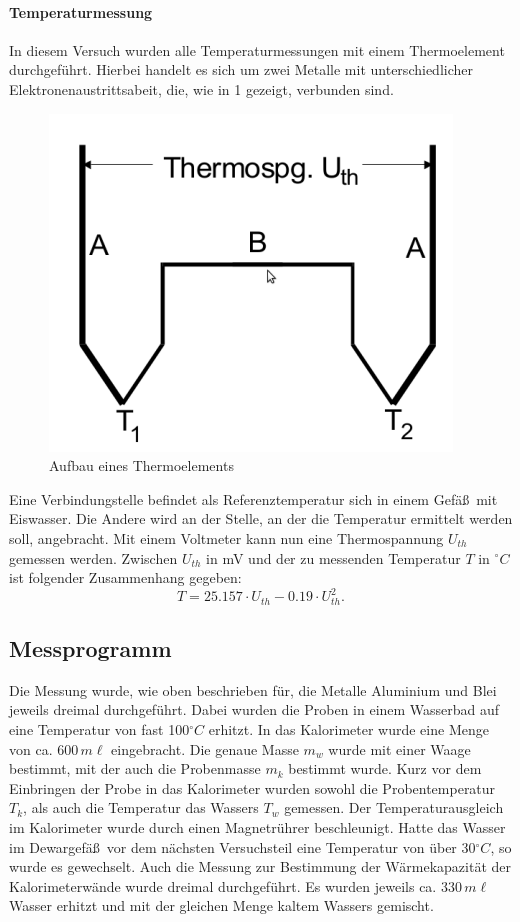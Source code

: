 \documentclass[11pt,ngerman,a4paper]{article}
\begin{document}
\paragraph{Temperaturmessung} In diesem Versuch wurden alle Temperaturmessungen mit einem Thermoelement durchgef\"uhrt. Hierbei handelt es sich um zwei Metalle mit unterschiedlicher Elektronenaustrittsabeit, die, wie in 1 gezeigt, verbunden sind.
\begin{figure}[htp]
\centering
\includegraphics[scale=0.4]{thermo.png}
\caption{Aufbau eines Thermoelements}
\end{figure}
Eine Verbindungstelle befindet als Referenztemperatur sich in einem Gef\"a\ss\ mit Eiswasser. Die Andere wird an der Stelle, an der die Temperatur ermittelt werden soll, angebracht. Mit einem Voltmeter kann nun eine Thermospannung $U_{th}$  gemessen werden. Zwischen $U_{th}$ in mV und der zu messenden Temperatur $T$ in $^\circ C$ ist folgender Zusammenhang gegeben:
\begin{equation}
T = 25.157\cdot U_{th} - 0.19\cdot U_{th}^2.
\end{equation} 



\subsection{Messprogramm}
Die Messung wurde, wie oben beschrieben f\"ur, die Metalle Aluminium und Blei jeweils dreimal durchgef\"uhrt. Dabei wurden die Proben in einem Wasserbad auf eine Temperatur von fast 100$^\circ C$ erhitzt. In das Kalorimeter wurde eine Menge von ca. $600\,m\ell$ eingebracht. Die genaue Masse $m_w$ wurde mit einer Waage bestimmt, mit der auch die Probenmasse $m_k$ bestimmt wurde. Kurz vor dem Einbringen der Probe in das Kalorimeter wurden sowohl die Probentemperatur $T_k$, als auch die Temperatur das Wassers $T_w$ gemessen. Der Temperaturausgleich im Kalorimeter wurde durch einen Magnetr\"uhrer beschleunigt. Hatte das Wasser im Dewargef\"a\ss\ vor dem n\"achsten Versuchsteil eine Temperatur von \"uber 30$^\circ C$, so wurde es gewechselt. Auch die Messung zur Bestimmung der W\"armekapazit\"at der Kalorimeterw\"ande wurde dreimal durchgef\"uhrt. Es wurden jeweils ca. $330\,m\ell$ Wasser erhitzt und mit der gleichen Menge kaltem Wassers gemischt.
\end{document}
